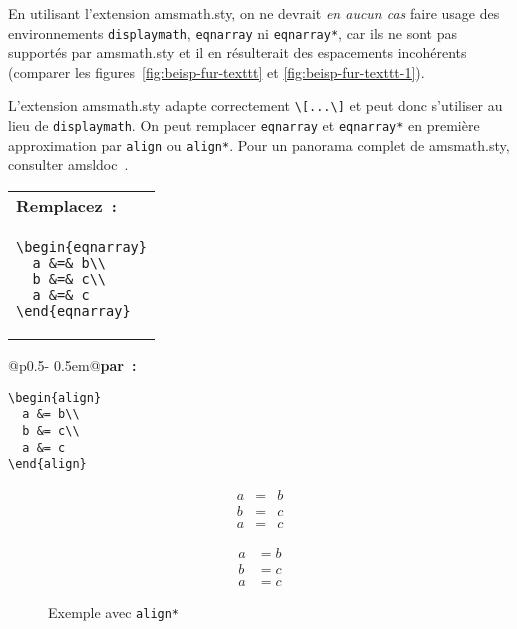 \documentclass[fontsize=11pt, paper=a4, pagesize, captions=tableheading, numbers=enddot, toc=graduated, footnotes=multiple]{scrartcl}%
\makeatletter
\newcommand{\Doku}[1]{\textsf{#1}\xspace}
\newcommand{\Paket}[1]{\textsf{#1.sty}\xspace}
\newenvironment{Ers}[1][\linewidth]{%
  \par\bigskip\noindent\marginline{\textcolor{gruen}{\boldmath $\triangleright$}}\begin{tabular}[t]{@{}p{0.5\textwidth}@{}}\textcolor{rot}{\textbf{\textsf{Remplacez~:}}%
}\\[2pt] \rahmenpr[#1]}%
{\endrahmenpr\end{tabular}}
\newenvironment{Dur}[1][0.5\textwidth]{%
\noindent\begin{tabular}[t]{@{}p{0.5\textwidth - 0.5em}@{}}\textcolor{gruen}{\textbf{\textsf{par~:}}}\\[2pt]\rahmenpg[#1]}%
{\endrahmenpg\end{tabular}\smallskip\noindent}
\makeatother
\begin{document}
En utilisant l'extension \Paket{amsmath}, on ne devrait \emph{en aucun cas} faire usage des environnements \texttt{displaymath}, \texttt{eqnarray} ni \texttt{eqnarray*}, car ils ne sont pas supportés par \Paket{amsmath} et il en résulterait des espacements incohérents (comparer les figures~\ref{fig:beisp-fur-texttt} et \vref{fig:beisp-fur-texttt-1}).

L’extension \Paket{amsmath} adapte correctement \verb+\[...\]+ et peut donc s'utiliser au lieu de \texttt{displaymath}. On peut remplacer \texttt{eqnarray} et \texttt{eqnarray*} en première approximation par \texttt{align} ou \texttt{align*}. Pour un panorama complet de \Paket{amsmath}, consulter \Doku{amsldoc}~\cite{amsldoc-99}.

\begin{Ers}
\begin{verbatim}
\begin{eqnarray}
  a &=& b\\
  b &=& c\\
  a &=& c
\end{eqnarray}
\end{verbatim}
\end{Ers}
\begin{Dur}
\begin{verbatim}
\begin{align}
  a &= b\\
  b &= c\\
  a &= c
\end{align}
\end{verbatim}
\end{Dur}
\begin{figure}
  \centering
  \begin{minipage}[t]{.45\linewidth}
      \begin{eqnarray*}
        a &=& b\\
        b &=& c\\
        a &=& c
      \end{eqnarray*}
    \caption{Exemple avec \texttt{eqnarray*}}
    \label{fig:beisp-fur-texttt}
  \end{minipage}\hfill
  \begin{minipage}[t]{.45\linewidth}
    \begin{align*}
      a &= b\\
      b &= c\\
      a &= c
    \end{align*}
    \caption{Exemple avec \texttt{align*}}
    \label{fig:beisp-fur-texttt-1}
  \end{minipage}
\end{figure}
\end{document}
